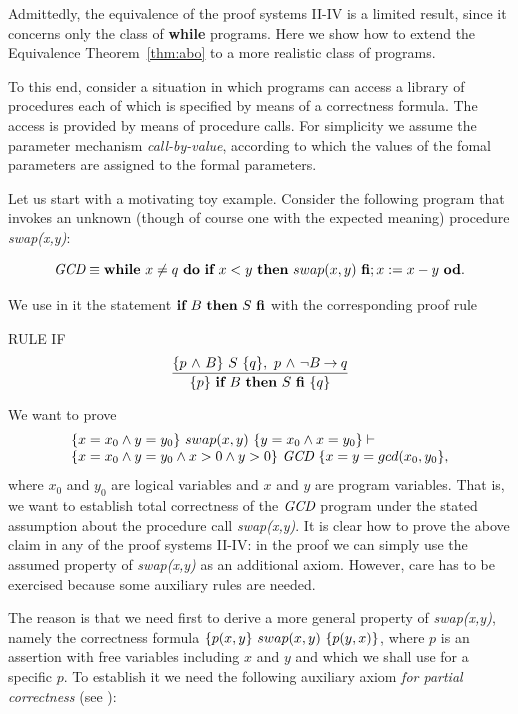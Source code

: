 \documentclass[manuscript, screen, review]{acmart}
\begin{document}
Admittedly, the equivalence of the proof systems II-IV is a limited
result, since it concerns only the class of \textbf{while}
programs. Here we show how to extend the Equivalence
Theorem~\ref{thm:abo} to a more realistic class of programs.

To this end, consider a situation in which programs can access a library of
procedures each of which is specified by means of a correctness
formula. The access is provided by means of procedure calls.  For
simplicity we assume the parameter mechanism \emph{call-by-value},
according to which the values of the fomal parameters are assigned to the
formal parameters.

Let us start with a motivating toy example. Consider the following program
that invokes an unknown (though of course one with the expected meaning)
procedure \emph{swap(x,y)}:

\[
\mbox{{\it GCD}} \equiv \mbox{$\mbox{{\bf while}\ } {x \neq q}\ \mbox{{\bf do}\ } {\mbox{$\mbox{{\bf if}\ } {x < y} \mbox{\ {\bf then}\ } {swap(x,y)}\ \mbox{{\bf fi}}$}; x:= x-y}\ \mbox{{\bf od}}$}.
\]

We use in it the statement $\mbox{$\mbox{{\bf if}\ } {B} \mbox{\ {\bf then}\ } {S}\ \mbox{{\bf fi}}$}$ 
with the corresponding proof rule
\III

\NI
RULE IF
  \[ \frac{ \mbox{$\{{p \mbox{$\ \wedge\ $} B}\}\ {S}\ \{{q}\}$}, \ p \mbox{$\ \wedge\ $} \neg B \mbox{$\:\rightarrow\:$} q}
  { \mbox{$\{{p}\}\ {\mbox{$\mbox{{\bf if}\ } {B} \mbox{\ {\bf then}\ } {S}\ \mbox{{\bf fi}}$}}\ \{{q}\}$}}
  \]
\III
  
We want to prove 
\begin{equation}
 \begin{array}{l}  
\mbox{$\{{x=x_0 \wedge y=y_0}\}\ {swap(x,y)}\ \{{y=x_0 \wedge x=y_0}\}$} \vdash  \\
   \mbox{$\{{x=x_0 \wedge y=y_0 \wedge x>0 \wedge y>0}\}\ {\mbox{{\it GCD}}}\ \{{x=y=gcd(x_0, y_0}\}$},
 \end{array}
 \label{equ:gcd}
\end{equation}
where $x_0$ and $y_0$ are logical variables and $x$ and $y$ are
program variables.  That is, we want to establish total correctness of
the $\mbox{{\it GCD}}$ program under the stated assumption about the procedure
call \emph{swap(x,y)}.  It is clear how to prove the above claim in
any of the proof systems II-IV: in the proof we can simply use the
assumed property of \emph{swap(x,y)} as an additional axiom. However,
care has to be exercised because some auxiliary rules are needed.

The reason is that we need first to derive a more general property of
\emph{swap(x,y)}, namely the correctness formula
$\mbox{$\{{p(x,y}\}\ {swap(x,y)}\ \{{p(y,x)}\}$}$, where $p$ is an assertion with free
variables including $x$ and $y$ and which we shall use for a specific
$p$.  To establish it we need the following auxiliary axiom \emph{for
  partial correctness} (see \cite[page 98]{ABO09}):
\end{document}
